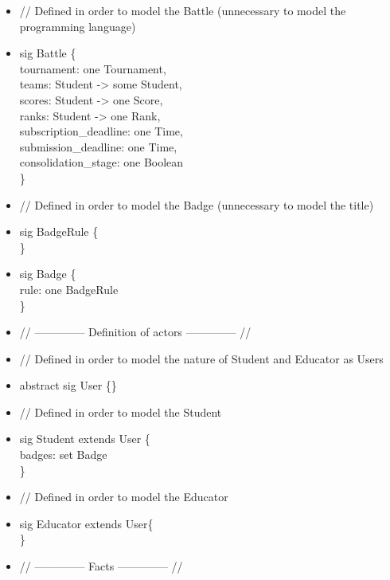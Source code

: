 \documentclass{Configuration_Files/Template}
\begin{document}
\begin{itemize}
\item // Defined in order to model the Battle (unnecessary to model the programming language)
\item sig Battle \{\\
tournament: one Tournament,\\
teams: Student -> some Student,\\
scores: Student -> one Score,\\
ranks: Student -> one Rank,\\
subscription\_deadline: one Time,\\
submission\_deadline: one Time,\\
consolidation\_stage: one Boolean\\
\}\\

\item // Defined in order to model the Badge (unnecessary to model the title)
\item sig BadgeRule \{\\
\}
\item sig Badge \{\\
rule: one BadgeRule\\
\}\\

\item // -------------- Definition of actors -------------- //\\

\item // Defined in order to model the nature of Student and Educator as Users
\item abstract sig User \{\}\\

\item // Defined in order to model the Student
\item sig Student extends User \{\\
badges: set Badge\\
\}\\

\item // Defined in order to model the Educator
\item sig Educator extends User\{\\
\}\\

\item //  -------------- Facts -------------- //\\


\end{itemize}
\end{document}
